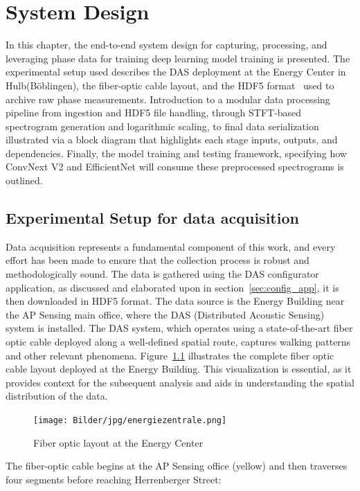 %
%
\chapter{System Design}
\label{sec:system_design}
In this chapter, the end-to-end system design for capturing, processing, and leveraging phase data for training deep learning model training is presented. The experimental setup used describes the DAS deployment at the Energy Center in Hulb(B\"oblingen), the fiber-optic cable layout, and the HDF5 format~\cite{hdf5} used to archive raw phase measurements. Introduction to a modular data processing pipeline from ingestion and HDF5 file handling, through STFT-based spectrogram generation and logarithmic scaling, to final data serialization illustrated via a block diagram that highlights each stage inputs, outputs, and dependencies. Finally, the model training and testing framework, specifying how ConvNext V2 and EfficientNet will consume these preprocessed spectrograms is outlined.

\section{Experimental Setup for data acquisition}\label{sec:experimental_setup}
Data acquisition represents a fundamental component of this work, and every effort has been made to ensure that the collection process is robust and methodologically sound. The data is gathered using the DAS configurator application, as discussed and elaborated upon in section~\ref{sec:config_app}, it is then downloaded in HDF5 format. The data source is the Energy Building near the AP Sensing main office, where the DAS (Distributed Acoustic Sensing) system is installed. The DAS system, which operates using a state-of-the-art fiber optic cable deployed along a well-defined spatial route, captures walking patterns and other relevant phenomena. Figure~\ref{energiezentrale} illustrates the complete fiber optic cable layout deployed at the Energy Building. This visualization is essential, as it provides context for the subsequent analysis and aids in understanding the spatial distribution of the data.

\begin{figure}[ht]
    \centering
    \texttt{[image: Bilder/jpg/energiezentrale.png]}
    \caption{Fiber optic layout at the Energy Center \cite{energy_ppt}}
    \label{energiezentrale}
\end{figure}

The fiber-optic cable begins at the AP Sensing office (yellow) and then traverses four segments before reaching Herrenberger Street:

